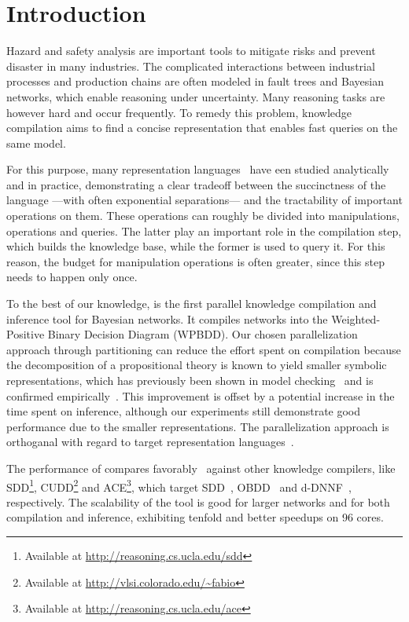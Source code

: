 
\section{Introduction}
\label{sec:introduction}

Hazard and safety analysis are important tools to mitigate risks and prevent disaster in many industries. The complicated interactions between industrial processes and production chains are often modeled in fault trees and Bayesian networks, which enable reasoning under uncertainty.
Many reasoning tasks are however hard and occur frequently. To remedy this problem, knowledge compilation aims to find a concise representation that enables fast queries on the same model.

For this purpose, many representation languages~\cite{darwiche2001decomposable,darwiche2002logical,darwiche2011sdd,darwiche2002knowledge,fargier2014knowledge,sanner2005affine,tafertshofer1997factored} have een studied analytically and in practice, demonstrating a clear tradeoff between the succinctness of the language ---with often exponential separations--- and the tractability of important operations on them. These operations can roughly be divided into manipulations, operations and queries. The latter play an important role in the compilation step, which builds the knowledge base, while the former is used to query it. For this reason, the budget for manipulation operations is often greater, since this step needs to happen only once.

To the best of our knowledge, \toolname is the first parallel knowledge compilation and inference tool for Bayesian networks. It compiles networks into the Weighted-Positive Binary Decision Diagram (WPBDD). Our chosen parallelization approach through partitioning can reduce the effort spent on compilation because the decomposition of a propositional theory is known to yield smaller symbolic representations, which has previously been shown in model checking~\cite{narayan1996partitioned,sahoo2004partitioning,grumberg2006work} and is confirmed empirically~\cite{dal2017reducing}.
 This improvement is offset by a potential increase in the time spent on inference, although our experiments still demonstrate good performance due to the smaller representations. The parallelization approach is orthoganal with regard to target representation languages~\cite{dal2018parallel}.

The performance of \toolname compares favorably~\cite{dal2018parallel} against other knowledge compilers, like  SDD\footnote{Available at \url{http://reasoning.cs.ucla.edu/sdd}}, CUDD\footnote{Available at \url{http://vlsi.colorado.edu/~fabio}} and ACE\footnote{Available at \url{http://reasoning.cs.ucla.edu/ace}}, which target SDD~\cite{darwiche2011sdd}, OBDD~\cite{bryant1986graph} and d-DNNF~\cite{darwiche2002knowledge}, respectively.
The scalability of the tool is good for larger networks and for both compilation and inference, exhibiting tenfold and better speedups on 96 cores.





